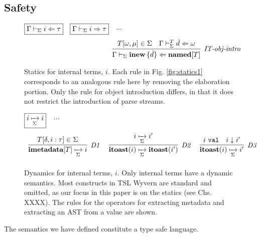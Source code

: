 \subsection{Safety}
\begin{figure}[t]
$\fbox{$\Gamma \vdash_\Sigma i \Leftarrow \tau$}$~
$\fbox{$\Gamma \vdash_\Sigma i \Rightarrow \tau$}$~~$\cdots$
\vspace{-25px}\[
\begin{array}{c}
~~~~~~~~~~~~~~~~~~~~~~~~~~~~~~~~~~~~\infer[\textit{IT-obj-intro}]
	{\Gamma \vdash_\Sigma \keyw{inew}\,\{\dot{d}\} \Leftarrow \keyw{named}[T]}
	{T[\omega,\mu] \in \Sigma & 
	\Gamma \vdash_\Sigma^T \dot{d} \Leftarrow \omega}
\end{array}
\]
\vspace{-12px}
\caption{Statics for internal terms, $i$. Each rule in Fig. \ref{fig:statics1} corresponds to an analogous rule here by removing the elaboration portion. Only the rule for object introduction differs, in that it does not restrict the introduction of parse streams. }
\label{it-statics}
\vspace{-5px}
\end{figure}
\begin{figure}[t]
$\fbox{$i \xmapsto[\Sigma]{} i$}$~~$\cdots$
\vspace{-10px}\[
\begin{array}{c}
\infer[\textit{D1}]
	{\keyw{imetadata}[T] \xmapsto[\Sigma]{} i} 
	{T[\delta,i:\tau] \in \Sigma}
~~~~
\infer[\textit{D2}]
	{\keyw{itoast}(i) \xmapsto[\Sigma]{} \keyw{itoast}(i') } 
	{i \xmapsto[\Sigma]{} i'}
~~~~
\infer[\textit{D3}]
	{\keyw{itoast}(i)  \xmapsto[\Sigma]{} i' } 
	{i\ \texttt{val} & i \downarrow i' }\\[2ex]
\end{array}
\]
\vspace{-15px}
\caption{Dynamics for internal terms, $i$. Only internal terms have a dynamic semantics. Most constructs in TSL Wyvern are standard and omitted, as our focus in this paper is on the statics (see \cite{pfpl} Chs. XXXX). The rules for the operators for extracting metadata and extracting an AST from a value are shown.}
\label{fig:dynsemantics}
\end{figure}

The semantics we have defined constitute a type safe language.

